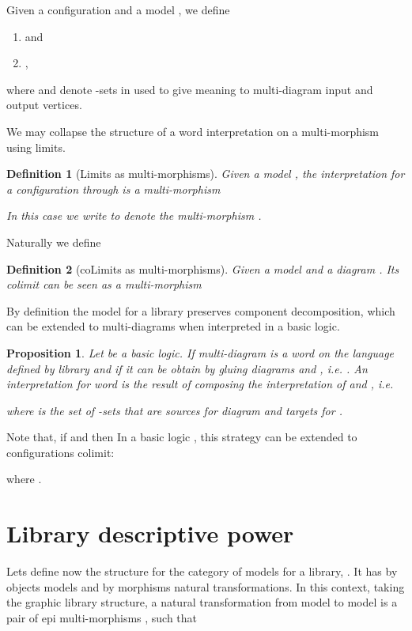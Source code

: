\documentclass[oribibl]{llncs}
\newtheorem{prop}{Proposition}
\newtheorem{defn}{Definition}
\begin{document}
Given a configuration  and a model , we define
\begin{enumerate}
  \item  and
  \item ,
\end{enumerate}
where  and  denote -sets in  used to give meaning to multi-diagram input and output vertices.

We may collapse the structure of a word interpretation on a multi-morphism using limits.

\begin{defn}[Limits as multi-morphisms]\label{def:word interpret}
Given a model , the \emph{interpretation for a configuration}
 through  is   a multi-morphism

In this case we write  to denote the multi-morphism .
\end{defn}

Naturally we define

\begin{defn}[coLimits as multi-morphisms]\label{def:colim interpret}
Given a model  and a diagram
. Its colimit  can be seen as a multi-morphism

\end{defn}

By definition the model for a library preserves component decomposition, which can be extended to multi-diagrams when interpreted in a basic logic.
\begin{prop}
Let  be a basic logic. If multi-diagram  is a word on the language defined by library  and if it can be obtain by gluing diagrams  and , i.e. . An interpretation for word   is the result of composing the interpretation of  and  , i.e.

where  is the set of -sets that are sources for diagram  and targets for .
\end{prop}

Note that, if  and  then 
In a basic logic , this strategy can be extended to configurations colimit:

where .

\section{Library descriptive power}\label{descritive power}

Lets define now the structure for the category of models for a library, . It has by objects models 
and by morphisms natural transformations. In this context, taking  the graphic library structure, a natural transformation from model  to model  is a pair of epi multi-morphisms , such that
\end{document}
